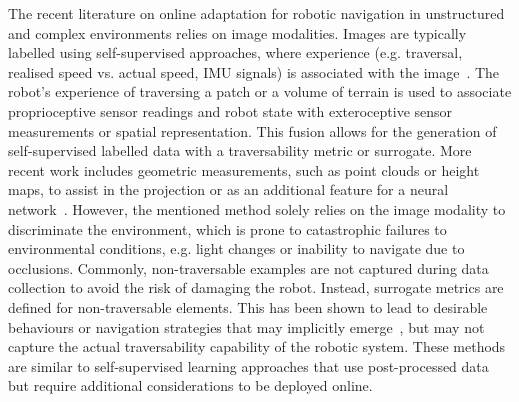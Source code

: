 The recent literature on online adaptation for robotic navigation in unstructured and complex environments relies on image modalities. Images are typically labelled using self-supervised approaches, where experience (e.g. traversal, realised speed vs. actual speed, IMU signals) is associated with the image~\cite{frey2023fast, bae2023self, wellhausen2019where, kahn2020badgr}. 
% 
The robot's experience of traversing a patch or a volume of terrain is used to associate proprioceptive sensor readings and robot state with exteroceptive sensor measurements or spatial representation. This fusion allows for the generation of self-supervised labelled data with a traversability metric or surrogate. More recent work includes geometric measurements, such as point clouds or height maps, to assist in the projection or as an additional feature for a neural network~\cite{li2023seeing, frey2024roadrunner}. However, the mentioned method solely relies on the image modality to discriminate the environment, which is prone to catastrophic failures to environmental conditions, e.g. light changes or inability to navigate due to occlusions.
% 
Commonly, non-traversable examples are not captured during data collection to avoid the risk of damaging the robot. Instead, surrogate metrics are defined for non-traversable elements. This has been shown to lead to desirable behaviours or navigation strategies that may implicitly emerge~\cite{frey2023fast}, but may not capture the actual traversability capability of the robotic system. These methods are similar to self-supervised learning approaches that use post-processed data but require additional considerations to be deployed online.


